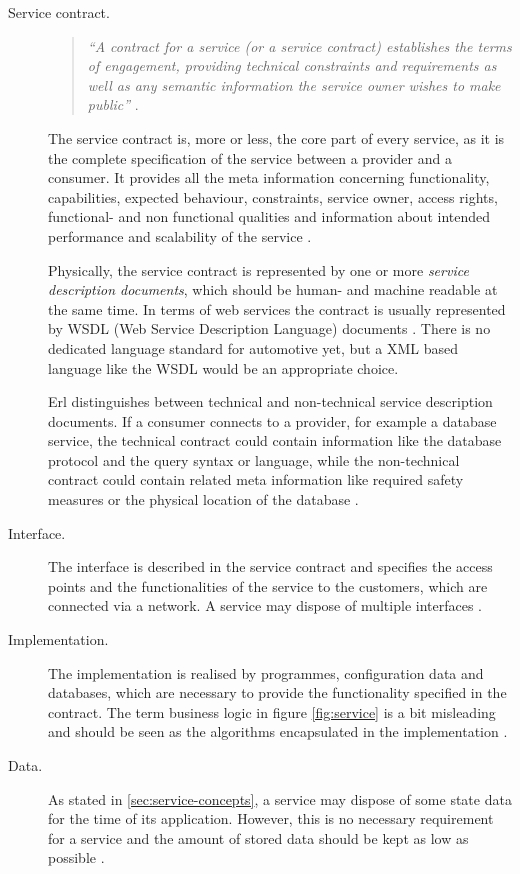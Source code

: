 \begin{description}
\item [Service contract.] 
\begin{quote}
\emph{``A contract for a service (or a service contract) establishes the terms of engagement, providing technical constraints and requirements as well as any semantic information the service owner wishes to make public''} 
\cite[ch.6.1]{erl2008}.
\end{quote}
The service contract is, more or less, the core part of every service, as it is the complete specification of the service between a provider and a consumer. It provides all the meta information concerning functionality, capabilities, expected behaviour, constraints, service owner, access rights, functional- and non functional qualities and information about intended performance and scalability of the service \cite[p.44]{krafzig} \cite[p.26]{josuttis} \cite{breivold}.

Physically, the service contract is represented by one or more \emph{service description documents}, which should be human- and machine readable at the same time. In terms of web services the contract is usually represented by WSDL (Web Service Description Language) documents \cite[p.43]{erl2011}. There is no dedicated language standard for automotive yet, but a XML based language like the WSDL would be an appropriate choice.

Erl \cite{erl2008} distinguishes between technical and non-technical service description documents. If a consumer connects to a provider, for example a database service, the technical contract could contain information like the database protocol and the query syntax or language, while the non-technical contract could contain related meta information like required safety measures or the physical location of the database \cite[ch.6.1]{erl2008}.

\item [Interface.] 
The interface is described in the service contract and specifies the access points and the functionalities of the service to the customers, which are connected via a network. A service may dispose of multiple interfaces \cite[p.44]{krafzig} \cite{breivold}.

\item [Implementation.] 
The implementation is realised by programmes, configuration data and databases, which are necessary to provide the functionality specified in the contract. The term business logic in figure \ref{fig:service} is a bit misleading and should be seen as the algorithms encapsulated in the implementation \cite[p.44]{krafzig}.

\item [Data.]
As stated in \ref{sec:service-concepts}, a service may dispose of some state data for the time of its application. However, this is no necessary requirement for a service and the amount of stored data should be kept as low as possible \cite[p.44]{krafzig}.
\end{description}

